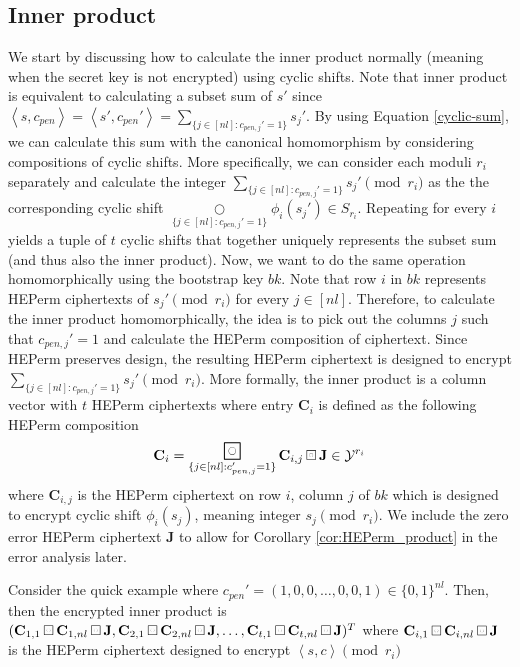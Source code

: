 \subsection*{Inner product}
We start by discussing how to calculate the inner product normally (meaning when the secret key is not encrypted) using cyclic shifts. Note that inner product is equivalent to calculating a subset sum of $s'$  since $\left \langle s, c_{pen} \right \rangle = \left \langle s', c_{pen}' \right \rangle = \sum\limits_{\{j \in [nl]: c_{pen,j}' = 1\}} s_j'$. By using Equation \ref{cyclic-sum}, we can calculate this sum with the canonical homomorphism by considering compositions of cyclic shifts. More specifically, we can consider each moduli $r_i$ separately and calculate the integer $\sum\limits_{\{j \in [nl]: c_{pen,j}' = 1\}} s_j' \pmod {r_i}$ as the the corresponding cyclic shift $\mathop{\bigcirc}\limits_{\{j \in [nl]: c_{pen,j}' = 1\}} \phi_i(s_j') \in S_{r_i}$. Repeating for every $i$ yields a tuple of $t$ cyclic shifts that together uniquely represents the subset sum (and thus also the inner product). Now, we want to do the same operation homomorphically using the bootstrap key $bk$. Note that row $i$ in $bk$ represents HEPerm ciphertexts of $s_j' \pmod {r_i}$ for every $j \in [nl]$. Therefore, to calculate the inner product homomorphically, the idea is to pick out the columns $j$ such that $c_{pen,j}' = 1$ and calculate the HEPerm composition of ciphertext. Since HEPerm preserves design, the resulting HEPerm ciphertext is designed to encrypt $\sum\limits_{\{j \in [nl]: c_{pen,j}' = 1\}} s_j' \pmod {r_i}$. More formally, the inner product is a column vector with $t$ HEPerm ciphertexts where entry $\mathbf{C}_i$ is defined as the following HEPerm composition
\begin{equation}\label{eq:inner_product}
    \mathbf{C}_{i} = \bigboxring\limits_{\{j \in [nl]: c_{pen,j}' = 1\}} \mathbf{C}_{i,j} \boxring \mathbf{J} \in \mathcal{Y}^{r_i}
\end{equation}
where $\mathbf{C}_{i,j}$ is the HEPerm ciphertext on row $i$, column $j$ of $bk$ which is designed to encrypt cyclic shift $\phi_i(s_j)$, meaning integer $s_j \pmod {r_i}$. We include the zero error HEPerm ciphertext $\mathbf{J}$ to allow for Corollary \ref{cor:HEPerm_product} in the error analysis later. 

Consider the quick example where $c_{pen}' = (1, 0, 0, \dots, 0, 0, 1) \in \{0,1\}^{nl}$. Then, then the encrypted inner product is $(\mathbf{C}_{1,1} \boxring \mathbf{C}_{1,nl} \boxring \mathbf{J}, \mathbf{C}_{2,1} \boxring \mathbf{C}_{2,nl} \boxring  \mathbf{J}, \dots, \mathbf{C}_{t,1} \boxring \mathbf{C}_{t,nl} \boxring \mathbf{J})^T$ where $\mathbf{C}_{i,1} \boxring \mathbf{C}_{i,nl} \boxring \mathbf{J}$ is the HEPerm ciphertext designed to encrypt $\left \langle s, c \right \rangle \pmod {r_i}$

